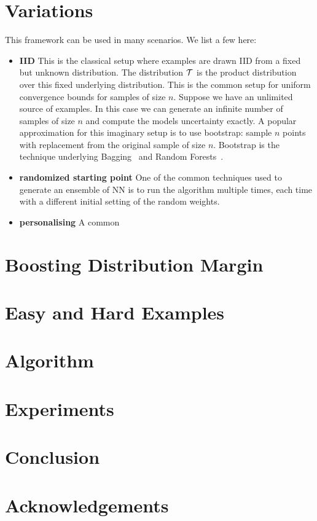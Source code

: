 \documentclass{article}
\begin{document}
\section{Variations}
This framework can be used in many scenarios. We list a few here:
\begin{itemize}
    \item {\bf IID} This is the classical setup where examples are drawn IID from a fixed but unknown distribution. The distribution ${\cal T}$ is the product distribution over this fixed underlying distribution. This is the common setup for uniform convergence bounds for samples of size $n$. 
    Suppose we have an unlimited source of examples. In this case we can generate an infinite number of samples of size $n$ and compute the models uncertainty exactly.  A popular approximation for this imaginary setup is to use bootstrap: sample $n$ points with replacement from the original sample of size $n$. Bootstrap is the technique underlying Bagging~\cite{} and Random Forests~\cite{}.
    \item {\bf randomized starting point} One of the common techniques used to generate an ensemble of NN is to run the algorithm multiple times, each time with a different initial setting of the random weights.
    \item {\bf personalising} A common
\end{itemize}

\section{Boosting Distribution Margin}
\label{sec:boosting_distribution_margin}
\section{Easy and Hard Examples}
\label{sec:easy_ad_hard_examples}
\section{Algorithm}
\label{sec:algorithm}
\section{Experiments}
\label{sec:experiments}
\section{Conclusion}
\label{sec:conclusion}
\section*{Acknowledgements}
\end{document}
